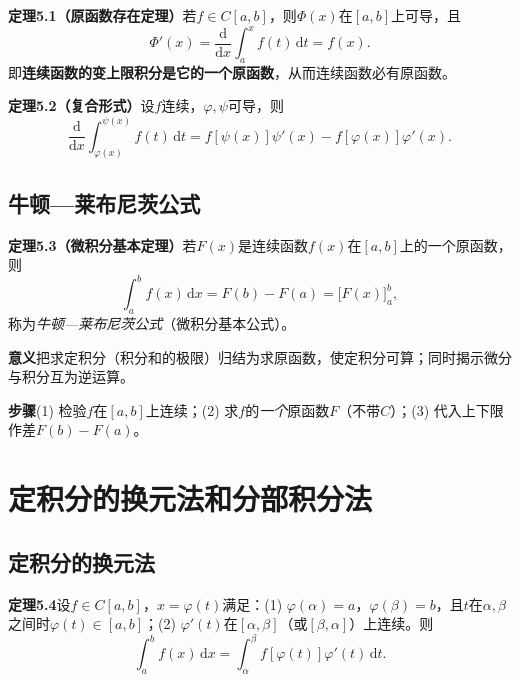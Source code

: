 \noindent\textbf{定理5.1（原函数存在定理）}\quad 若$f\in C[a,b]$，则$\Phi(x)$在$[a,b]$上可导，且
\[
\Phi'(x)=\frac{\mathrm{d}}{\mathrm{d}x}\int_a^xf(t)\,\mathrm{d}t=f(x).
\]
即\textbf{连续函数的变上限积分是它的一个原函数}，从而连续函数必有原函数。

\noindent\textbf{定理5.2（复合形式）}\quad 设$f$连续，$\varphi,\psi$可导，则
\[
\frac{\mathrm{d}}{\mathrm{d}x}\int_{\varphi(x)}^{\psi(x)}f(t)\,\mathrm{d}t=f[\psi(x)]\psi'(x)-f[\varphi(x)]\varphi'(x).
\]



\subsection{牛顿—莱布尼茨公式}

\noindent\textbf{定理5.3（微积分基本定理）}\quad 若$F(x)$是连续函数$f(x)$在$[a,b]$上的一个原函数，则
\[
\int_a^bf(x)\,\mathrm{d}x=F(b)-F(a)=\bigl[F(x)\bigr]_a^b ,
\]
称为\emph{牛顿—莱布尼茨公式}（微积分基本公式）。

\noindent\textbf{意义}\quad 把求定积分（积分和的极限）归结为求原函数，使定积分可算；同时揭示微分与积分互为逆运算。

\noindent\textbf{步骤}\quad (1) 检验$f$在$[a,b]$上连续；(2) 求$f$的\emph{一个}原函数$F$（不带$C$）；(3) 代入上下限作差$F(b)-F(a)$。


\section{定积分的换元法和分部积分法}

\subsection{定积分的换元法}

\noindent\textbf{定理5.4}\quad 设$f\in C[a,b]$，$x=\varphi(t)$满足：(1) $\varphi(\alpha)=a$，$\varphi(\beta)=b$，且$t$在$\alpha,\beta$之间时$\varphi(t)\in[a,b]$；(2) $\varphi'(t)$在$[\alpha,\beta]$（或$[\beta,\alpha]$）上连续。则
\[
\int_a^bf(x)\,\mathrm{d}x=\int_{\alpha}^{\beta}f[\varphi(t)]\varphi'(t)\,\mathrm{d}t .
\]

